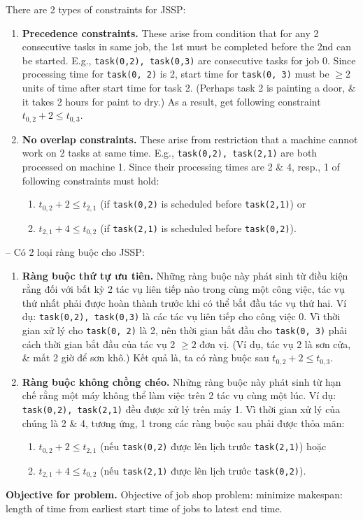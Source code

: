 \documentclass{article}
\begin{document}
There are 2 types of constraints for JSSP:
\begin{enumerate}
    \item {\bf Precedence constraints.} These arise from condition that for any 2 consecutive tasks in same job, the 1st must be completed before the 2nd can be started. E.g., {\tt task(0,2), task(0,3)} are consecutive tasks for job 0. Since processing time for {\tt task(0, 2)} is 2, start time for {\tt task(0, 3)} must be $\ge2$ units of time after start time for task 2. (Perhaps task 2 is painting a door, \& it takes 2 hours for paint to dry.) As a result, get following constraint $t_{0,2} + 2\le t_{0,3}$.
    \item {\bf No overlap constraints.} These arise from restriction that a machine cannot work on 2 tasks at same time. E.g., {\tt task(0,2), task(2,1)} are both processed on machine 1. Since their processing times are 2 \& 4, resp., 1 of following constraints must hold:
    \begin{enumerate}
        \item $t_{0,2} + 2\le t_{2,1}$ (if {\tt task(0,2)} is scheduled before {\tt task(2,1)}) or
        \item $t_{2,1} + 4\le t_{0,2}$ (if {\tt task(2,1)} is scheduled before {\tt task(0,2)}).
    \end{enumerate}
\end{enumerate}
-- Có 2 loại ràng buộc cho JSSP:
\begin{enumerate}
    \item {\bf Ràng buộc thứ tự ưu tiên.} Những ràng buộc này phát sinh từ điều kiện rằng đối với bất kỳ 2 tác vụ liên tiếp nào trong cùng một công việc, tác vụ thứ nhất phải được hoàn thành trước khi có thể bắt đầu tác vụ thứ hai. Ví dụ: {\tt task(0,2), task(0,3)} là các tác vụ liên tiếp cho công việc 0. Vì thời gian xử lý cho {\tt task(0, 2)} là 2, nên thời gian bắt đầu cho {\tt task(0, 3)} phải cách thời gian bắt đầu của tác vụ 2 $\ge2$ đơn vị. (Ví dụ, tác vụ 2 là sơn cửa, \& mất 2 giờ để sơn khô.) Kết quả là, ta có ràng buộc sau $t_{0,2} + 2\le t_{0,3}$.
    \item {\bf Ràng buộc không chồng chéo.} Những ràng buộc này phát sinh từ hạn chế rằng một máy không thể làm việc trên 2 tác vụ cùng một lúc. Ví dụ: {\tt task(0,2), task(2,1)} đều được xử lý trên máy 1. Vì thời gian xử lý của chúng là 2 \& 4, tương ứng, 1 trong các ràng buộc sau phải được thỏa mãn:
    \begin{enumerate}
        \item $t_{0,2} + 2\le t_{2,1}$ (nếu {\tt task(0,2)} được lên lịch trước {\tt task(2,1)}) hoặc
        \item $t_{2,1} + 4\le t_{0,2}$ (nếu {\tt task(2,1)} được lên lịch trước {\tt task(0,2)}).
    \end{enumerate}
\end{enumerate}
{\bf Objective for problem.} Objective of job shop problem: minimize makespan: length of time from earliest start time of jobs to latest end time.
\end{document}
